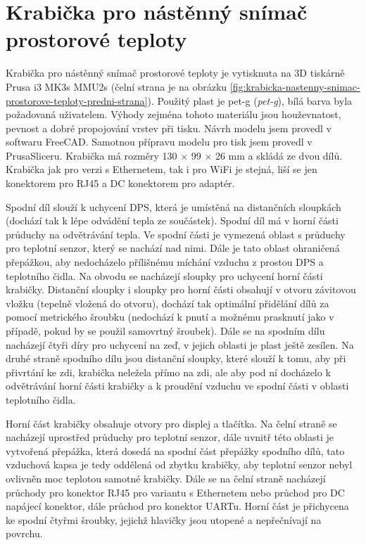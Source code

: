 \section{Krabička pro nástěnný snímač prostorové teploty}
\label{sec:krabicka-pro-nastenny-snimac-prostorove-teploty}
Krabička pro nástěnný snímač prostorové teploty je vytisknuta na 3D tiskárně Prusa i3 MK3s MMU2s (čelní strana je na obrázku \ref{fig:krabicka-nastenny-snimac-prostorove-teploty-predni-strana}). Použitý plast je \acrshort{pet-g} (\textit{\acrlong{pet-g}}), bílá barva byla požadovaná uživatelem. Výhody zejména tohoto materiálu jsou houževnatost, pevnost a dobré propojování vrstev při tisku. Návrh modelu jsem provedl v softwaru FreeCAD. Samotnou přípravu modelu pro tisk jsem provedl v  PrusaSliceru. Krabička má rozměry 130 × 99 × 26 mm a skládá ze dvou dílů. Krabička jak pro verzi s Ethernetem, tak i pro WiFi je stejná, liší se jen konektorem pro RJ45 a DC konektorem pro adaptér.

Spodní díl slouží k uchycení DPS, která je umístěná na distančních sloupkách (dochází tak k lépe odvádění tepla ze součástek). Spodní díl má v horní části průduchy na odvětrávání tepla. Ve spodní části je vymezená oblast s průduchy pro teplotní senzor, který se nachází nad nimi. Dále je tato oblast ohraničená přepážkou, aby nedocházelo přílišnému míchání vzduchu z prostou DPS a teplotního čidla. Na obvodu se nacházejí sloupky pro uchycení horní části krabičky. Distanční sloupky i sloupky pro horní části obsahují v otvoru závitovou vložku (tepelně vložená do otvoru), dochází tak optimální přidělání dílů za pomocí metrického šroubku (nedochází k pnutí a možnému prasknutí jako v případě, pokud by se použil samovrtný šroubek). Dále se na spodním dílu nacházejí čtyři díry pro uchycení na zeď, v jejich oblasti je plast ještě zesílen. Na druhé straně spodního dílu jsou distanční sloupky, které slouží k tomu, aby při přivrtání ke zdi, krabička neležela přímo na zdi, ale aby pod ní docházelo k odvětrávání horní části krabičky a k proudění vzduchu ve spodní části v oblasti teplotního čidla.

Horní část krabičky obsahuje otvory pro displej a tlačítka. Na čelní straně se nacházejí uprostřed průduchy pro teplotní senzor, dále uvnitř této oblasti je vytvořená přepážka, která dosedá na spodní část přepážky spodního dílů, tato vzduchová kapsa je tedy oddělená od zbytku krabičky, aby teplotní senzor nebyl ovlivněn moc teplotou samotné krabičky. Dále se na čelní straně nacházejí průchody pro konektor RJ45 pro variantu s Ethernetem nebo průchod pro DC napájecí konektor, dále průchod pro konektor UARTu. Horní část je přichycena ke spodní čtyřmi šroubky, jejichž hlavičky jsou utopené a nepřečnívají na povrchu.

